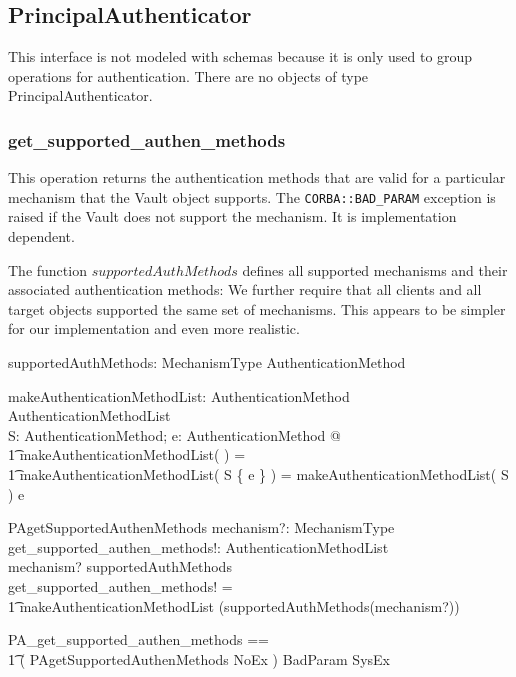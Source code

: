\subsection{PrincipalAuthenticator \label{sec:PrincipalAuthenticator}}

\vspace{2ex}

This interface is not modeled with schemas because it is only used to group
operations for authentication.  There are no objects of type
PrincipalAuthenticator.

\subsubsection{get\_supported\_authen\_methods}
This operation returns the authentication methods that are valid for a
particular mechanism that the Vault object supports.  The
\texttt{CORBA::BAD\_PARAM} exception is raised if the Vault does not support the
mechanism.  It is implementation dependent.

The function $supportedAuthMethods$ defines all supported mechanisms and their
associated authentication methods: We further require that all clients and all
target objects supported the same set of mechanisms.  This appears to be simpler
for our implementation and even more realistic.
\begin{axdef}
  supportedAuthMethods: MechanismType \pfun \power AuthenticationMethod
\end{axdef}

\begin{axdef}
  makeAuthenticationMethodList: \power AuthenticationMethod \fun
  AuthenticationMethodList \\
  \where
  \forall S: \power AuthenticationMethod; e: AuthenticationMethod @ \\
  \t1 makeAuthenticationMethodList( \emptyset ) = \langle \rangle \land \\
  \t1 makeAuthenticationMethodList( S \cup \{ e \} ) =
  makeAuthenticationMethodList( S ) \cat \langle e \rangle \\ 
\end{axdef}

\begin{schema}{PAgetSupportedAuthenMethods}
  mechanism?: MechanismType \\
  get\_supported\_authen\_methods!: AuthenticationMethodList \\
  \where
  mechanism? \in \dom supportedAuthMethods \\
  get\_supported\_authen\_methods! = \\
  \t1 makeAuthenticationMethodList (supportedAuthMethods(mechanism?))\\ 
\end{schema}
\begin{zed}
  PA\_get\_supported\_authen\_methods == \\
  \t1 ( PAgetSupportedAuthenMethods \land NoEx ) \lor BadParam \lor SysEx
\end{zed}


